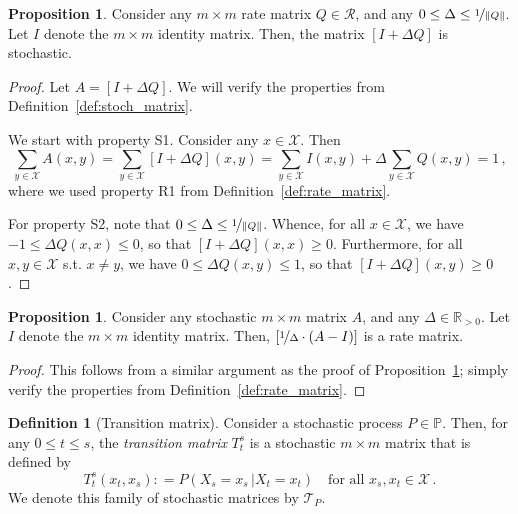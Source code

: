 \documentclass[10pt]{paper}
\theoremstyle{definition}
\newtheorem{proposition}[theorem]{Proposition}
\newtheorem{definition}{Definition}
\newcommand{\reals}{\mathbb{R}}
\newcommand{\realspos}{\reals_{>0}}
\newcommand{\states}{\mathcal{X}}
\newcommand{\processes}{\mathbb{P}}
\newcommand{\norm}[1]{\left\lVert #1 \right\rVert}
\newcommand{\coloneqq}{:\!=}
\begin{document}
\begin{proposition}\label{prop:stochastic_from_rate_matrix}
Consider any $m\times m$ rate matrix $Q\in\mathcal{R}$, and any $0\leq \Delta \leq \nicefrac{1}{\norm{Q}}$. Let $I$ denote the $m\times m$ identity matrix. Then, the matrix $[I+\Delta Q]$ is stochastic.
\end{proposition}
\begin{proof}
Let $A=[I+\Delta Q]$. We will verify the properties from Definition~\ref{def:stoch_matrix}.

We start with property S1. Consider any $x\in\states$. Then
\begin{equation*}
\sum_{y\in\states} A(x,y) = \sum_{y\in\states} [I + \Delta Q](x,y) = \sum_{y\in\states}I(x,y) + \Delta \sum_{y\in\states}Q(x,y) = 1\,,
\end{equation*}
where we used property R1 from Definition~\ref{def:rate_matrix}.

For property S2, note that $0\leq \Delta \leq \nicefrac{1}{\norm{Q}}$. Whence, for all $x\in\states$, we have $-1\leq \Delta Q(x,x) \leq 0$, so that $[I+\Delta Q](x,x) \geq 0$. Furthermore, for all $x,y\in\states$ s.t. $x\neq y$, we have $0\leq \Delta Q(x,y) \leq 1$, so that $[I+\Delta Q](x,y)\geq 0$.
\end{proof}

\begin{proposition}\label{prop:rate_from_stochastic_matrix}
Consider any stochastic $m\times m$ matrix $A$, and any $\Delta\in\realspos$. Let $I$ denote the $m\times m$ identity matrix. Then, $[\nicefrac{1}{\Delta}\cdot(A-I)]$ is a rate matrix.
\end{proposition}
\begin{proof}
This follows from a similar argument as the proof of Proposition~\ref{prop:stochastic_from_rate_matrix}; simply verify the properties from Definition~\ref{def:rate_matrix}.
\end{proof}

\begin{definition}[Transition matrix]\label{def:trans_matrix}
Consider a stochastic process $P\in\processes$. Then, for any $0\leq t\leq s$, the \emph{transition matrix} $T_t^s$ is a stochastic $m\times m$ matrix that is defined by
\begin{equation*}
T_t^s(x_t, x_s) \coloneqq P(X_s=x_s\,\vert X_t=x_t)\quad\text{for all $x_s,x_t\in\states$}\,.
\end{equation*}
We denote this family of stochastic matrices by $\mathcal{T}_P$.%
\end{definition}
\end{document}
